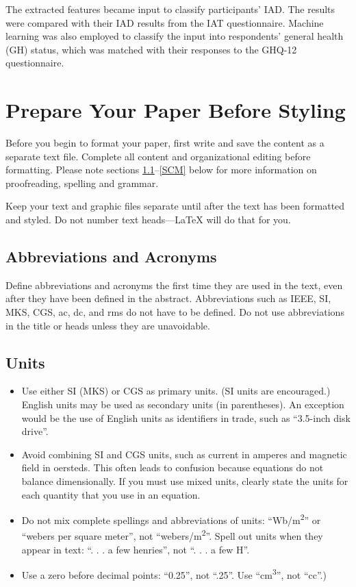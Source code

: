 \documentclass[conference]{IEEEtran}
\begin{document}
The extracted features became input to classify participants’ IAD. The results were compared with their IAD results from the IAT questionnaire. Machine learning was also employed to classify the input into respondents’ general health (GH) status, which was matched with their responses to the GHQ-12 questionnaire.

\section{Prepare Your Paper Before Styling}
Before you begin to format your paper, first write and save the content as a 
separate text file. Complete all content and organizational editing before 
formatting. Please note sections \ref{AA}--\ref{SCM} below for more information on 
proofreading, spelling and grammar.

Keep your text and graphic files separate until after the text has been 
formatted and styled. Do not number text heads---{\LaTeX} will do that 
for you.

\subsection{Abbreviations and Acronyms}\label{AA}
Define abbreviations and acronyms the first time they are used in the text, 
even after they have been defined in the abstract. Abbreviations such as 
IEEE, SI, MKS, CGS, ac, dc, and rms do not have to be defined. Do not use 
abbreviations in the title or heads unless they are unavoidable.

\subsection{Units}
\begin{itemize}
\item Use either SI (MKS) or CGS as primary units. (SI units are encouraged.) English units may be used as secondary units (in parentheses). An exception would be the use of English units as identifiers in trade, such as ``3.5-inch disk drive''.
\item Avoid combining SI and CGS units, such as current in amperes and magnetic field in oersteds. This often leads to confusion because equations do not balance dimensionally. If you must use mixed units, clearly state the units for each quantity that you use in an equation.
\item Do not mix complete spellings and abbreviations of units: ``Wb/m\textsuperscript{2}'' or ``webers per square meter'', not ``webers/m\textsuperscript{2}''. Spell out units when they appear in text: ``. . . a few henries'', not ``. . . a few H''.
\item Use a zero before decimal points: ``0.25'', not ``.25''. Use ``cm\textsuperscript{3}'', not ``cc''.)
\end{itemize}
\end{document}

